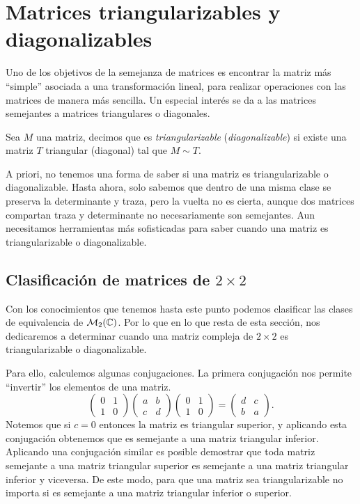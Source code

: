 \section{Matrices triangularizables y diagonalizables}

Uno de los objetivos de la semejanza de matrices es encontrar la matriz más ``simple'' asociada a una transformación lineal, para realizar operaciones con las matrices de manera más sencilla. Un especial interés se da a las matrices semejantes a matrices triangulares o diagonales.

\begin{defi}
  Sea $M$ una matriz, decimos que es \emph{triangularizable} (\emph{diagonalizable}) si existe una matriz $T$ triangular (diagonal) tal que $M \sim T$.
\end{defi}

A priori, no tenemos una forma de saber si una matriz es triangularizable o diagonalizable. Hasta ahora, solo sabemos que dentro de una misma clase se preserva la determinante y traza, pero la vuelta no es cierta, aunque dos matrices compartan traza y determinante no necesariamente son semejantes. Aun necesitamos herramientas más sofisticadas para saber cuando una matriz es triangularizable o diagonalizable.

\subsection{Clasificación de matrices de $2\times 2$}

Con los conocimientos que tenemos hasta este punto podemos clasificar las clases de equivalencia de $\mathcal{M}_2(\mathbb{C})$. Por lo que en lo que resta de esta sección, nos dedicaremos a determinar cuando una matriz compleja de $2\times 2$ es triangularizable o diagonalizable.

Para ello, calculemos algunas conjugaciones. La primera conjugación nos permite ``invertir'' los elementos de una matriz.
\begin{equation}
  \begin{pmatrix} 0 & 1 \\ 1 & 0 \end{pmatrix}
  \begin{pmatrix} a & b \\ c & d \end{pmatrix}
  \begin{pmatrix} 0 & 1 \\ 1 & 0 \end{pmatrix}
    = \begin{pmatrix} d & c \\ b & a \end{pmatrix}. \label{eq:ConjI}
\end{equation}
Notemos que si $c = 0$ entonces la matriz es triangular superior, y aplicando esta conjugación obtenemos que es semejante a una matriz triangular inferior. Aplicando una conjugación similar es posible demostrar que toda matriz semejante a una matriz triangular superior es semejante a una matriz triangular inferior y viceversa. De este modo, para que una matriz sea triangularizable no importa si es semejante a una matriz triangular inferior o superior.

